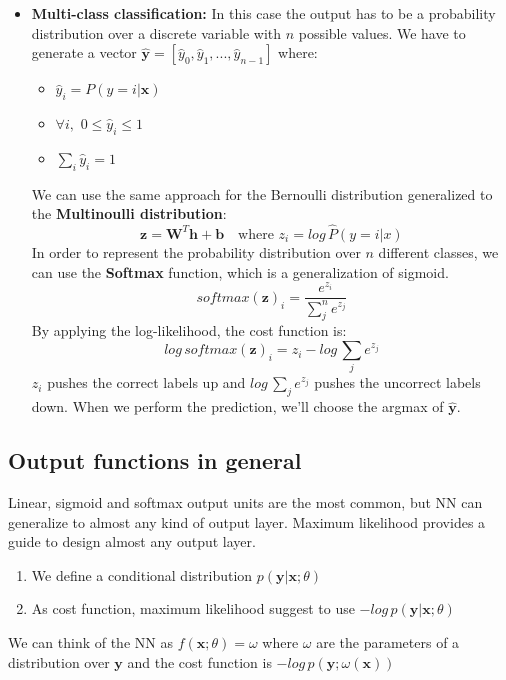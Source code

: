 \begin{itemize}
    \item \textbf{Multi-class classification:} In this case the output has to be a probability distribution over a discrete variable with $n$ possible values. We have to generate a vector $\hat{\textbf{y}}= [\hat{y}_0, \hat{y}_1, ..., \hat{y}_{n-1}]$ where:
    \begin{itemize}
        \item $\hat{y}_i = P(y = i | \textbf{x})$
        \item $\forall i,\,\, 0 \leq \hat{y}_i \leq 1$
        \item $\sum_i \hat{y}_i = 1$
    \end{itemize}
    We can use the same approach for the Bernoulli distribution generalized to the \textbf{Multinoulli distribution}:
    \[\textbf{z} = \textbf{W}^{T}\textbf{h} + \textbf{b} \quad \text{where}\,\, z_i = log\, \hat{P}(y = i | x)\]
    In order to represent the probability distribution over $n$ different classes, we can use the \textbf{Softmax} function, which is a generalization of sigmoid.
    \[softmax(\textbf{z})_i = \frac{e^{z_i}}{\sum_j^n e^{z_j}}\]
    By applying the log-likelihood, the cost function is:
    \[log\, softmax(\textbf{z})_i = z_i - log \, \sum_j e^{z_j}\]
    $z_i$ pushes the correct labels up and $log \, \sum_j e^{z_j}$ pushes the uncorrect labels down. When we perform the prediction, we'll choose the argmax of $\hat{\textbf{y}}$.
\end{itemize}

\subsection{Output functions in general}
Linear, sigmoid and softmax output units are the most common, but NN can generalize to almost any kind of output layer.\newline\newline
Maximum likelihood provides a guide to design almost any output layer.
\begin{enumerate}
    \item We define a conditional distribution $p(\textbf{y}|\textbf{x}; \theta)$
    \item As cost function, maximum likelihood suggest to use $-log\, p(\textbf{y}|\textbf{x}; \theta)$
\end{enumerate}
We can think of the NN as $f(\textbf{x}; \theta) = \omega$ where $\omega$ are the parameters of a distribution over $\textbf{y}$ and the cost function is $-log\, p(\textbf{y};\omega(\textbf{x}))$

